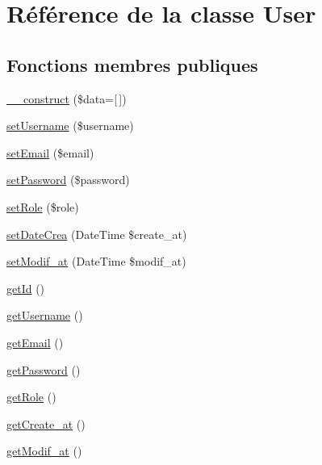 \hypertarget{class_src_1_1_entity_1_1_user}{}\section{Référence de la classe User}
\label{class_src_1_1_entity_1_1_user}
\subsection*{Fonctions membres publiques}
\begin{DoxyCompactItemize}
\item 
\hyperlink{class_src_1_1_entity_1_1_user_ab3129f1d71e9f51353de9d551ea381d7}{\+\_\+\+\_\+construct} (\$data=\mbox{[}$\,$\mbox{]})
\item 
\hyperlink{class_src_1_1_entity_1_1_user_ac359b701a2ccaff746dd480f03314244}{set\+Username} (\$username)
\item 
\hyperlink{class_src_1_1_entity_1_1_user_a5ef76eef42d2624386442eeb636d338c}{set\+Email} (\$email)
\item 
\hyperlink{class_src_1_1_entity_1_1_user_a3e35c8d3dbb2c513c618a664389e0926}{set\+Password} (\$password)
\item 
\hyperlink{class_src_1_1_entity_1_1_user_aa9233284be00bee150c4982e73785b72}{set\+Role} (\$role)
\item 
\hyperlink{class_src_1_1_entity_1_1_user_a9c8311c6d2e7d1d118a6a6da7b577c0b}{set\+Date\+Crea} (Date\+Time \$create\+\_\+at)
\item 
\hyperlink{class_src_1_1_entity_1_1_user_a9f9f5983de6ae197176a80f55f113a6c}{set\+Modif\+\_\+at} (Date\+Time \$modif\+\_\+at)
\item 
\hyperlink{class_src_1_1_entity_1_1_user_a12251d0c022e9e21c137a105ff683f13}{get\+Id} ()
\item 
\hyperlink{class_src_1_1_entity_1_1_user_a81b37a3c9d639574e394f80c1138c75e}{get\+Username} ()
\item 
\hyperlink{class_src_1_1_entity_1_1_user_a02a01849f28e2535e888ae4ec87b20f2}{get\+Email} ()
\item 
\hyperlink{class_src_1_1_entity_1_1_user_a04e0957baeb7acde9c0c86556da2d43f}{get\+Password} ()
\item 
\hyperlink{class_src_1_1_entity_1_1_user_a0b2e7098f1c48a7439a42bada5b69689}{get\+Role} ()
\item 
\hyperlink{class_src_1_1_entity_1_1_user_ae5e6c0bedcef3f514100c20ee92c901a}{get\+Create\+\_\+at} ()
\item 
\hyperlink{class_src_1_1_entity_1_1_user_a5858386cc69be9863ed37e0ceb2697b1}{get\+Modif\+\_\+at} ()
\end{DoxyCompactItemize}


